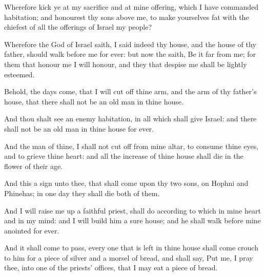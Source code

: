 {Wherefore
kick ye at my
sacrifice and at mine
offering, which I have
commanded
{}
habitation; and
honourest thy
sons above me, to make yourselves
fat with the
chiefest of all the
offerings of
Israel my
people?

Wherefore the
{}
God of
Israel
saith, I
said
indeed
{} thy
house, and the
house of thy
father, should
walk
before me
for
ever: but now the
{}
saith, Be it far from
me; for them that
honour me I will
honour, and they that
despise me shall be lightly
esteemed.

Behold, the
days
come, that I will cut
off thine
arm, and the
arm of thy
father’s
house, that there shall not be an old
man in thine
house.

And thou shalt
see an
enemy
{}
habitation, in all
{} which
{} shall
give
Israel: and there shall not be an old
man in thine
house for
ever.

And the
man of thine,
{} I shall not cut
off from mine
altar,
{} to
consume thine
eyes, and to
grieve thine
heart: and all the
increase of thine
house shall
die in the flower of their
age.

And this
{} a
sign unto thee, that shall
come upon thy
two
sons, on
Hophni and
Phinehas; in
one
day they shall
die
both of them.

And I will raise me
up a
faithful
priest,
{} shall
do according to
{} which
{} in mine
heart and in my
mind: and I will
build him a
sure
house; and he shall
walk
before mine
anointed for
ever.

And it shall come to pass,
{} every one that is
left in thine
house shall
come
{}
crouch to him for a
piece of
silver and a
morsel of
bread, and shall
say,
Put me, I pray thee, into
one of the
priests’ offices, that I may
eat a
piece of
bread.




\par }
